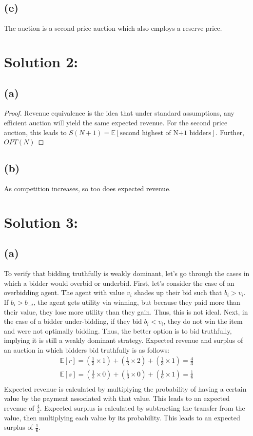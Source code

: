 \documentclass[10pt,a4paper]{article}
\begin{document}
  \subsection*{(e)}
    The auction is a second price auction which also employs a reserve price.
\section*{Solution 2:}
  \subsection*{(a)}
    \begin{proof}
      Revenue equivalence is the idea that under standard assumptions, any efficient auction will yield the same expected revenue. For the second price auction, this leads to $S(N+1) = \mathbb{E}[\text{second highest of N+1 bidders}]$. Further, $OPT(N)$  
    \end{proof}
  \subsection*{(b)}
    As competition increases, so too does expected revenue. 

\section*{Solution 3:}
  \subsection*{(a)}
    To verify that bidding truthfully is weakly dominant, let's go through the cases in which a bidder would overbid or underbid. First, let's consider the case of an overbidding agent. The agent with value $v_i$ shades up their bid such that $b_i>v_i$. If $b_i>b_{-i}$, the agent gets utility via winning, but because they paid more than their value, they lose more utility than they gain. Thus, this is not ideal. Next, in the case of a bidder under-bidding, if they bid $b_i<v_i$, they do not win the item and were not optimally bidding. Thus, the better option is to bid truthfully, implying it is still a weakly dominant strategy.
    Expected revenue and surplus of an auction in which bidders bid truthfully is as follows:
    \begin{gather*}
      \mathbb{E}[r] = (\frac{1}{3}\times1) + (\frac{1}{3}\times2) +
      (\frac{1}{3}\times1) = \frac{4}{3} \\ 
      \mathbb{E}[s] = (\frac{1}{3}\times0) + (\frac{1}{3}\times0) +
      (\frac{1}{6}\times1) = \frac{1}{6} \\
    \end{gather*}
    Expected revenue is calculated by multiplying the probability of having a certain value by the payment associated with that value. This leads to an expected revenue of $\frac{4}{3}$. Expected surplus is calculated by subtracting the transfer from the value, then multiplying each value by its probability. This leads to an expected surplus of $\frac{1}{6}$.
\end{document}
